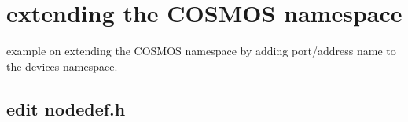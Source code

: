 %    
%
%
%
%
%
%
%
%
%
%
%
%



\newpage
\section{extending the COSMOS namespace}

example on extending the COSMOS namespace by adding port/address name to the devices namespace.

\subsection{edit nodedef.h}

